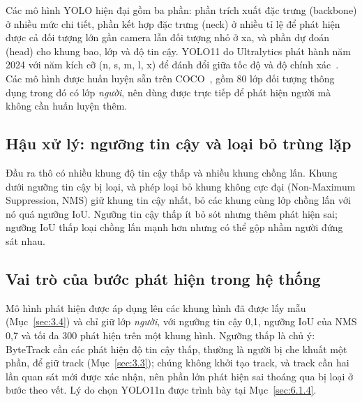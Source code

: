 Các mô hình YOLO hiện đại gồm ba phần: phần trích xuất đặc trưng (backbone) ở nhiều mức chi tiết, phần kết hợp đặc trưng (neck) ở nhiều tỉ lệ để phát hiện được cả đối tượng lớn gần camera lẫn đối tượng nhỏ ở xa, và phần dự đoán (head) cho khung bao, lớp và độ tin cậy. YOLO11 do Ultralytics phát hành năm 2024 với năm kích cỡ (n, s, m, l, x) để đánh đổi giữa tốc độ và độ chính xác~\cite{ultralytics2024yolo11docs}. Các mô hình được huấn luyện sẵn trên COCO~\cite{lin2014coco}, gồm 80 lớp đối tượng thông dụng trong đó có lớp \emph{người}, nên dùng được trực tiếp để phát hiện người mà không cần huấn luyện thêm.

\subsection{Hậu xử lý: ngưỡng tin cậy và loại bỏ trùng lặp}
\label{sec:3.2.4}

Đầu ra thô có nhiều khung độ tin cậy thấp và nhiều khung chồng lấn. Khung dưới ngưỡng tin cậy bị loại, và phép loại bỏ khung không cực đại (Non-Maximum Suppression, NMS) giữ khung tin cậy nhất, bỏ các khung cùng lớp chồng lấn với nó quá ngưỡng IoU. Ngưỡng tin cậy thấp ít bỏ sót nhưng thêm phát hiện sai; ngưỡng IoU thấp loại chồng lấn mạnh hơn nhưng có thể gộp nhầm người đứng sát nhau.

\subsection{Vai trò của bước phát hiện trong hệ thống}
\label{sec:3.2.5}

Mô hình phát hiện được áp dụng lên các khung hình đã được lấy mẫu (Mục~\ref{sec:3.4}) và chỉ giữ lớp \emph{người}, với ngưỡng tin cậy 0,1, ngưỡng IoU của NMS 0,7 và tối đa 300 phát hiện trên một khung hình. Ngưỡng thấp là chủ ý: ByteTrack cần các phát hiện độ tin cậy thấp, thường là người bị che khuất một phần, để giữ track (Mục~\ref{sec:3.3}); chúng không khởi tạo track, và track cần hai lần quan sát mới được xác nhận, nên phần lớn phát hiện sai thoáng qua bị loại ở bước theo vết. Lý do chọn YOLO11n được trình bày tại Mục~\ref{sec:6.1.4}.
